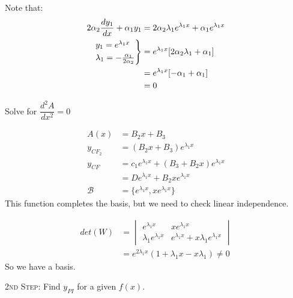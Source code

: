 \documentclass[10pt]{scrartcl}
\begin{document}
Note that: 
\[
\begin{aligned}
  2\alpha_2\frac{dy_1}{dx} +\alpha_1y_1 &= 2\alpha_2\lambda_1e^{\lambda_1x} + \alpha_1e^{\lambda_1x}\\
  \begin{rcases*}
  y_1 = e^{\lambda_1x}\\
  \lambda_1 = -\frac{\alpha_1}{2\alpha_2}	
  \end{rcases*}
  &= e^{\lambda_1x}[2\alpha_2\lambda_1 + \alpha_1]\\
  &= e^{\lambda_1x}[-\alpha_1+\alpha_1]\\
  &= 0
\end{aligned}
\]

Solve for $\dfrac{d^2A}{dx^2} = 0$

\[
\begin{aligned}
  A(x) &= B_2x + B_3\\
  y_{CF_2} &= (B_2x + B_3)e^{\lambda_1x}\\
  y_{CF} &= c_1e^{\lambda_1x} + (B_3 + B_2x)e^{\lambda_1x}\\
  &= De^{\lambda_1x} + B_2xe^{\lambda_1x}\\
  \mathcal{B} &= \{e^{\lambda_1x},xe^{\lambda_1x}\}
\end{aligned}
\]
This function completes the basis, but we need to check linear independence. 

\[
\begin{aligned}
  det(W) &= \begin{vmatrix}
  e^{\lambda_1x} & xe^{\lambda_1x}\\
  \lambda_1e^{\lambda_1x} & e^{\lambda_1x} + x\lambda_1e^{\lambda_1x}
  \end{vmatrix}\\
  &= e^{2\lambda_1x}(1+\lambda_1x - x\lambda_1) \neq 0
\end{aligned}
\]
So we have a basis. 

\textsc{2nd Step:} Find $y_{PI}$ for a given $f(x)$.\\
\end{document}
